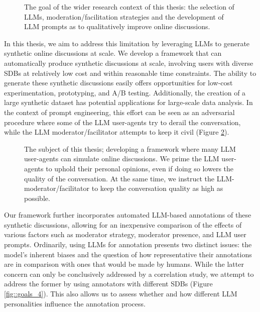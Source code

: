 \begin{figure}
	\centering
	
	\caption{The goal of the wider research context of this thesis: the selection of LLMs, moderation/facilitation strategies and the development of LLM prompts as to qualitatively improve online discussions.}
	\label{fig::goals_2}
\end{figure}

In this thesis, we aim to address this limitation by leveraging \acp{LLM} to generate synthetic online discussions at scale. We develop a framework that can automatically produce synthetic discussions at scale, involving users with diverse \acp{SDB} at relatively low cost and within reasonable time constraints. The ability to generate these synthetic discussions easily offers opportunities for low-cost experimentation, prototyping, and A/B testing. Additionally, the creation of a large synthetic dataset has potential applications for large-scale data analysis. In the context of prompt engineering, this effort can be seen as an adversarial procedure where some of the LLM user-agents try to derail the conversation, while the LLM moderator/facilitator attempts to keep it civil (Figure \ref{fig::goals_3}).

\begin{figure}
	\centering
	
	\caption{The subject of this thesis; developing a framework where many LLM user-agents can simulate online discussions. We prime the LLM user-agents to uphold their personal opinions, even if doing so lowers the quality of the conversation. At the same time, we instruct the LLM-moderator/facilitator to keep the conversation quality as high as possible.}
	\label{fig::goals_3}
\end{figure}

Our framework further incorporates automated LLM-based annotations of these synthetic discussions, allowing for an inexpensive comparison of the effects of various factors such as moderator strategy, moderator presence, and LLM user prompts. Ordinarily, using LLMs for annotation presents two distinct issues: the model's inherent biases and the question of how representative their annotations are in comparison with ones that would be made by humans. While the latter concern can only be conclusively addressed by a correlation study, we attempt to address the former by using annotators with different \acp{SDB} (Figure \ref{fig::goals_4}). This also allows us to assess whether and how different LLM personalities influence the annotation process. 

